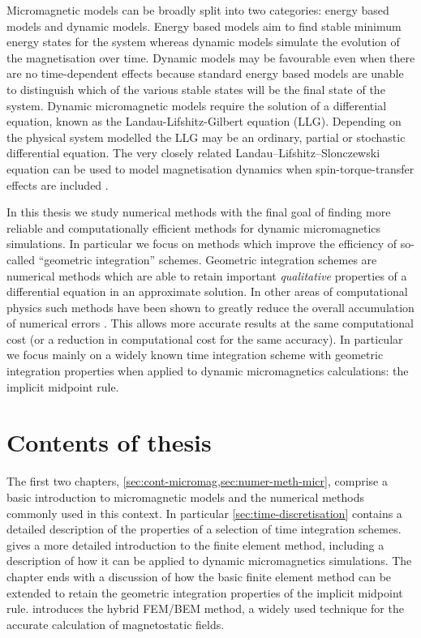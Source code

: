 Micromagnetic models can be broadly split into two categories: energy based models and dynamic models.
Energy based models aim to find stable minimum energy states for the system whereas
dynamic models simulate the evolution of the magnetisation over time.
Dynamic models may be favourable even when there are no time-dependent effects because standard energy based models are unable to distinguish which of the various stable states will be the final state of the system.
Dynamic micromagnetic models require the solution of a differential equation, known as the Landau-Lifshitz-Gilbert equation (LLG).
Depending on the physical system modelled the LLG may be an ordinary, partial or stochastic differential equation.
The very closely related Landau–Lifshitz–Slonczewski equation can be used to model magnetisation dynamics when spin-torque-transfer effects are included \cite{Slonczewski1996}.


In this thesis we study numerical methods with the final goal of finding more reliable and computationally efficient methods for dynamic micromagnetics simulations.
In particular we focus on methods which improve the efficiency of so-called ``geometric integration'' schemes.
Geometric integration schemes are numerical methods which are able to retain important \emph{qualitative} properties of a differential equation in an approximate solution.
In other areas of computational physics such methods have been shown to greatly reduce the overall accumulation of numerical errors \cite[77]{Iserles2009}.
This allows more accurate results at the same computational cost (or a reduction in computational cost for the same accuracy).
In particular we focus mainly on a widely known time integration scheme with geometric integration properties when applied to dynamic micromagnetics calculations: the implicit midpoint rule.



\section{Contents of thesis}

The first two chapters, \cref{sec:cont-micromag,sec:numer-meth-micr}, comprise a basic introduction to micromagnetic models and the numerical methods commonly used in this context.
In particular \cref{sec:time-discretisation} contains a detailed description of the properties of a selection of time integration schemes.
 gives a more detailed introduction to the finite element method, including a description of how it can be applied to dynamic micromagnetics simulations.
The chapter ends with a discussion of how the basic finite element method can be extended to retain the geometric integration properties of the implicit midpoint rule.
 introduces the hybrid FEM/BEM method, a widely used technique for the accurate calculation of magnetostatic fields.


